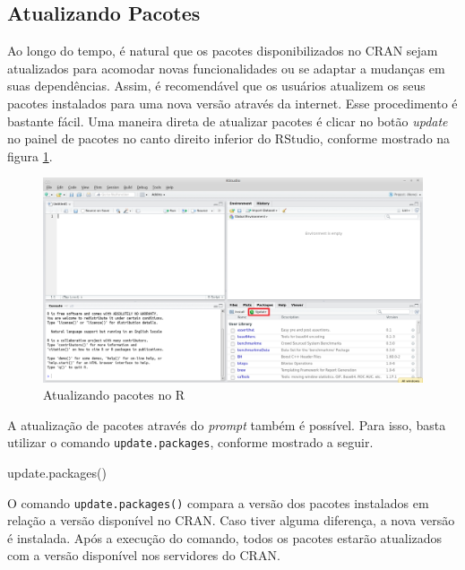 \documentclass[
  11pt,
]{book}
\newenvironment{Shaded}{\begin{snugshade}}{\end{snugshade}}
\newcommand{\FunctionTok}[1]{\textcolor[rgb]{0,0,0}{#1}}
\newcommand{\NormalTok}[1]{#1}
\begin{document}
\hypertarget{atualizando-pacotes}{%
\subsection{Atualizando Pacotes}\label{atualizando-pacotes}}

Ao longo do tempo, é natural que os pacotes disponibilizados no CRAN sejam atualizados para acomodar novas funcionalidades ou se adaptar a mudanças em suas dependências. Assim, é recomendável que os usuários atualizem os seus pacotes instalados para uma nova versão através da internet. Esse procedimento é bastante fácil. Uma maneira direta de atualizar pacotes é clicar no botão \emph{update} no painel de pacotes no canto direito inferior do RStudio, conforme mostrado na figura \ref{fig:RStudio-update}.

\begin{figure}[!htbp]

{\centering \includegraphics[width=1\linewidth]{00-text-resources/figs/RStudio_update} 

}

\caption{Atualizando pacotes no R}\label{fig:RStudio-update}
\end{figure}

A atualização de pacotes através do \emph{prompt} também é possível. Para isso, basta utilizar o comando \texttt{update.packages}, conforme mostrado a seguir. 

\begin{Shaded}
\begin{Highlighting}[]
\FunctionTok{update.packages}\NormalTok{()}
\end{Highlighting}
\end{Shaded}

O comando \texttt{update.packages()} compara a versão dos pacotes instalados em relação a versão disponível no CRAN. Caso tiver alguma diferença, a nova versão é instalada. Após a execução do comando, todos os pacotes estarão atualizados com a versão disponível nos servidores do CRAN.
\end{document}
